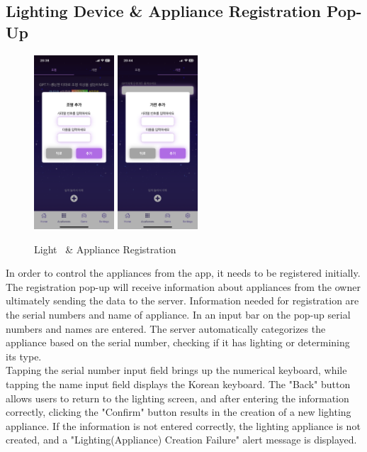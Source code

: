 \documentclass[conference]{IEEEtran}
\begin{document}
    \subsection{Lighting Device \& Appliance Registration Pop-Up}
        \begin{figure}[htbp]
            \centerline{\includegraphics[width=3cm]{Images/screen/light/2_LIGHT_ADD_EMPTY.PNG}
            \includegraphics[width=3cm]{Images/screen/elec/2_ELEC_ADD_EMPTY.PNG}}
            \caption{Light \ & Appliance Registration}
            \label{fig}
        \end{figure}
        In order to control the appliances from the app, it needs to be registered initially. The registration pop-up will receive information about appliances from the owner ultimately sending the data to the server. Information needed for registration are the serial numbers and name of appliance. In an input bar on the pop-up serial numbers and names are entered. The server automatically categorizes the appliance based on the serial number, checking if it has lighting or determining its type.\\
        Tapping the serial number input field brings up the numerical keyboard, while tapping the name input field displays the Korean keyboard. The "Back" button allows users to return to the lighting screen, and after entering the information correctly, clicking the "Confirm" button results in the creation of a new lighting appliance. If the information is not entered correctly, the lighting appliance is not created, and a "Lighting(Appliance) Creation Failure" alert message is displayed.
\end{document}
